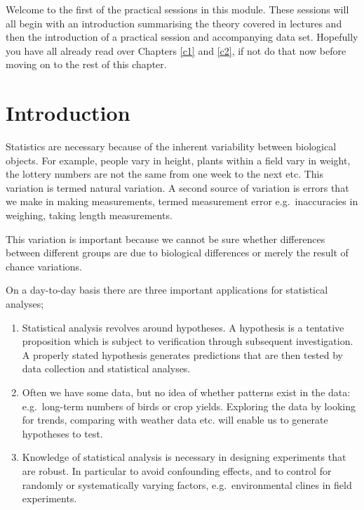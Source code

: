 \documentclass[
]{book}
\begin{document}
Welcome to the first of the practical sessions in this module. These sessions will all begin with an introduction summarising the theory covered in lectures and then the introduction of a practical session and accompanying data set. Hopefully you have all already read over Chapters \ref{c1} and \ref{c2}, if not do that now before moving on to the rest of this chapter.

\hypertarget{introduction}{%
\section{Introduction}\label{introduction}}

Statistics are necessary because of the inherent variability between biological objects. For example, people vary in height, plants within a field vary in weight, the lottery numbers are not the same from one week to the next etc. This variation is termed natural variation. A second source of variation is errors that we make in making measurements, termed measurement error e.g.~inaccuracies in weighing, taking length measurements.

This variation is important because we cannot be sure whether differences between different groups are due to biological differences or merely the result of chance variations.

On a day-to-day basis there are three important applications for statistical analyses;

\begin{enumerate}
\def\labelenumi{\arabic{enumi})}
\item
  Statistical analysis revolves around hypotheses. A hypothesis is a tentative proposition which is subject to verification through subsequent investigation. A properly stated hypothesis generates predictions that are then tested by data collection and statistical analyses.
\item
  Often we have some data, but no idea of whether patterns exist in the data: e.g.~long-term numbers of birds or crop yields. Exploring the data by looking for trends, comparing with weather data etc. will enable us to generate hypotheses to test.
\item
  Knowledge of statistical analysis is necessary in designing experiments that are robust. In particular to avoid confounding effects, and to control for randomly or systematically varying factors, e.g.~environmental clines in field experiments.
\end{enumerate}
\end{document}

